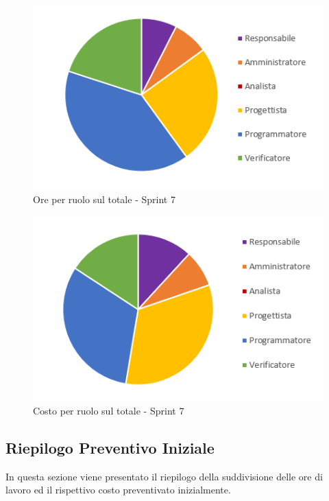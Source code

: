 \begin{figure}[H]
  \centering
  \includegraphics[scale=0.8]{immagini/7Sprint_oreRuolo.png}
  \caption{Ore per ruolo sul totale - Sprint 7}
\end{figure}

\begin{figure}[H]
  \centering
  \includegraphics[scale=0.8]{immagini/7Sprint_costoRuolo.png}
  \caption{Costo per ruolo sul totale - Sprint 7}
\end{figure}
\pagebreak

\subsection{Riepilogo Preventivo Iniziale} \label{subsection:preventivo_riepilogo}
In questa sezione viene presentato il riepilogo della suddivisione delle ore di lavoro ed il rispettivo costo preventivato inizialmente.

